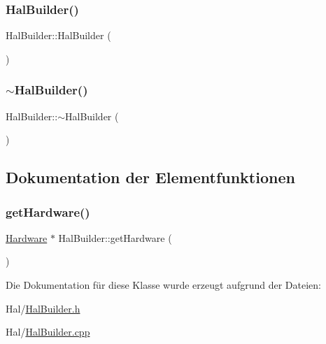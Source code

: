 \subsubsection{\texorpdfstring{Hal\+Builder()}{HalBuilder()}}
{\footnotesize\ttfamily Hal\+Builder\+::\+Hal\+Builder (\begin{DoxyParamCaption}{ }\end{DoxyParamCaption})}

\hypertarget{class_hal_builder_af77e28e213c8aa028b18cf435e9ef3c8}{}\label{class_hal_builder_af77e28e213c8aa028b18cf435e9ef3c8} 
\subsubsection{\texorpdfstring{$\sim$\+Hal\+Builder()}{~HalBuilder()}}
{\footnotesize\ttfamily Hal\+Builder\+::$\sim$\+Hal\+Builder (\begin{DoxyParamCaption}{ }\end{DoxyParamCaption})\hspace{0.3cm}{\ttfamily [virtual]}}



\subsection{Dokumentation der Elementfunktionen}
\hypertarget{class_hal_builder_addc8f400dfa9dee3f0d9de116512212f}{}\label{class_hal_builder_addc8f400dfa9dee3f0d9de116512212f} 
\subsubsection{\texorpdfstring{get\+Hardware()}{getHardware()}}
{\footnotesize\ttfamily \hyperlink{class_hardware}{Hardware} $\ast$ Hal\+Builder\+::get\+Hardware (\begin{DoxyParamCaption}{ }\end{DoxyParamCaption})}



Die Dokumentation für diese Klasse wurde erzeugt aufgrund der Dateien\+:\begin{DoxyCompactItemize}
\item 
Hal/\hyperlink{_hal_builder_8h}{Hal\+Builder.\+h}\item 
Hal/\hyperlink{_hal_builder_8cpp}{Hal\+Builder.\+cpp}\end{DoxyCompactItemize}
